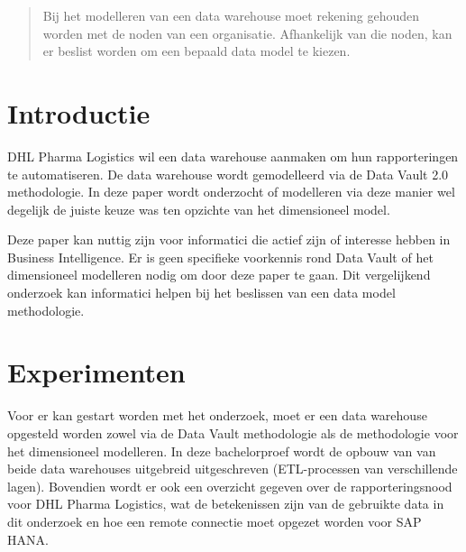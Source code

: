 \documentclass[a0,portrait]{a0poster}
\begin{document}
\begin{multicols}{2} %


\color{HoGentAccent1} %

\begin{abstract}
Bij het modelleren van een data warehouse moet rekening gehouden worden met de noden van een organisatie. Afhankelijk van die noden, kan er beslist worden om een bepaald data model te kiezen.
\end{abstract}

\color{HoGentAccent1} 
\section*{Introductie}
\color{black}
\color{black}
DHL Pharma Logistics wil een data warehouse aanmaken om hun rapporteringen te automatiseren. De data warehouse wordt gemodelleerd via de Data Vault 2.0 methodologie. In deze paper wordt onderzocht of modelleren via deze manier wel degelijk de juiste keuze was ten opzichte van het dimensioneel model.

Deze paper kan nuttig zijn voor informatici die actief zijn of interesse hebben in Business Intelligence. Er is geen specifieke voorkennis rond Data Vault of het dimensioneel modelleren nodig om door deze paper te gaan. Dit vergelijkend onderzoek kan informatici helpen bij het beslissen van een data model methodologie.


\color{Black} %
\color{HoGentAccent1} 
\section*{Experimenten}
\color{black}
Voor er kan gestart worden met het onderzoek, moet er een data warehouse opgesteld worden zowel via de Data Vault methodologie als de methodologie voor het dimensioneel modelleren. In deze bachelorproef wordt de opbouw van van beide data warehouses uitgebreid uitgeschreven (ETL-processen van verschillende lagen). Bovendien wordt er ook een overzicht gegeven over de rapporteringsnood voor DHL Pharma Logistics, wat de betekenissen zijn van de gebruikte data in dit onderzoek en hoe een remote connectie moet opgezet worden voor SAP HANA.


\end{multicols}
\end{document}
